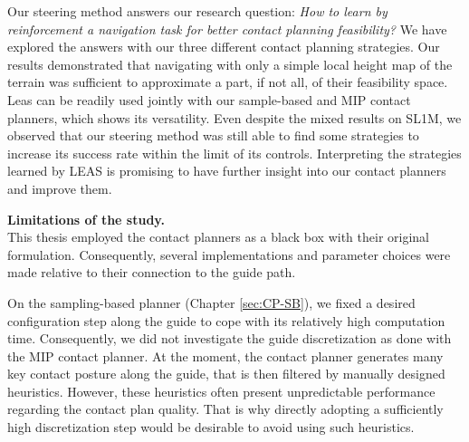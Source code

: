 

Our steering method answers our research question: \textit{How to learn by reinforcement a navigation task for better contact planning feasibility?}
We have explored the answers with our three different contact planning strategies.
Our results demonstrated that navigating with only a simple local height map of the terrain was sufficient to approximate a part, if not all, of their feasibility space.
Leas can be readily used jointly with our sample-based and MIP contact planners, which shows its versatility. 
Even despite the mixed results on SL1M, we observed that our steering method was still able to find some strategies to increase its success rate within the limit of its controls.
Interpreting the strategies learned by LEAS is promising to have further insight into our contact planners and improve them.


\hfill \break

\noindent\textbf{Limitations of the study.}\\

This thesis employed the contact planners as a black box with their original formulation. Consequently, several implementations and parameter choices were made relative to their connection to the guide path.

On the sampling-based planner (Chapter \ref{sec:CP-SB}), we fixed a desired configuration step along the guide to cope with its relatively high computation time. 
Consequently, we did not investigate the guide discretization as done with the MIP contact planner.
At the moment, the contact planner generates many key contact posture along the guide, that is then filtered by manually designed heuristics. 
However, these heuristics often present unpredictable performance regarding the contact plan quality.
That is why directly adopting a sufficiently high discretization step would be desirable to avoid using such heuristics.

